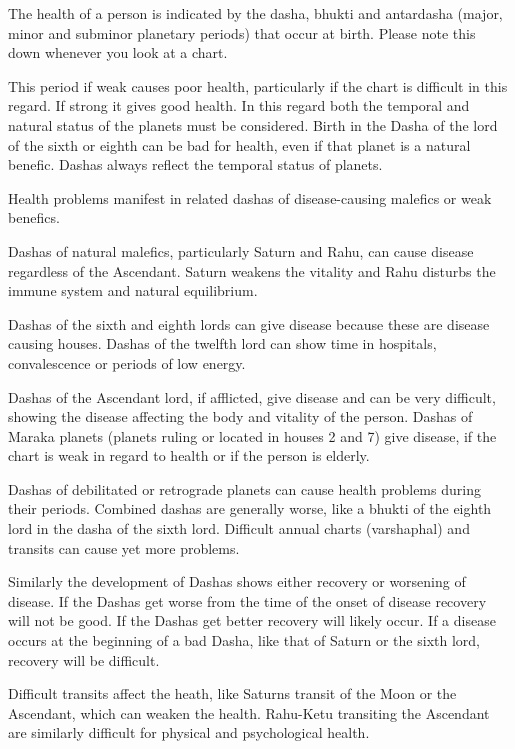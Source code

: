The health of a person is indicated by the dasha, bhukti and antardasha (major, minor and subminor planetary periods) that occur at birth. Please note this down whenever you look at a chart.
 

This period if weak causes poor health, particularly if the chart is difficult in this regard. If strong it gives good health. In this regard both the temporal and natural status of the planets must be considered. Birth in the Dasha of the lord of the sixth or eighth can be bad for health, even if that planet is a natural benefic. Dashas always reflect the temporal status of planets.

 

Health problems manifest in related dashas of disease-causing malefics or weak benefics.

 

Dashas of natural malefics, particularly Saturn and Rahu, can cause disease regardless of the Ascendant. Saturn weakens the vitality and Rahu disturbs the immune system and natural equilibrium.
 

Dashas of the sixth and eighth lords can give disease because these are disease causing houses. Dashas of the twelfth lord can show time in hospitals, convalescence or periods of low energy.

 

Dashas of the Ascendant lord, if afflicted, give disease and can be very difficult, showing the disease affecting the body and vitality of the person. Dashas of Maraka planets (planets ruling or located in houses 2 and 7) give disease, if the chart is weak in regard to health or if the person is elderly.

 

Dashas of debilitated or retrograde planets can cause health problems during their periods. Combined dashas are generally worse, like a bhukti of the eighth lord in the dasha of the sixth lord. Difficult annual charts (varshaphal) and transits can cause yet more problems.

 

Similarly the development of Dashas shows either recovery or worsening of disease. If the Dashas get worse from the time of the onset of disease recovery will not be good. If the Dashas get better recovery will likely occur. If a disease occurs at the beginning of a bad Dasha, like that of Saturn or the sixth lord, recovery will be difficult.

 

Difficult transits affect the heath, like Saturns transit of the Moon or the Ascendant, which can weaken the health. Rahu-Ketu transiting the Ascendant are similarly difficult for physical and psychological health.
 

